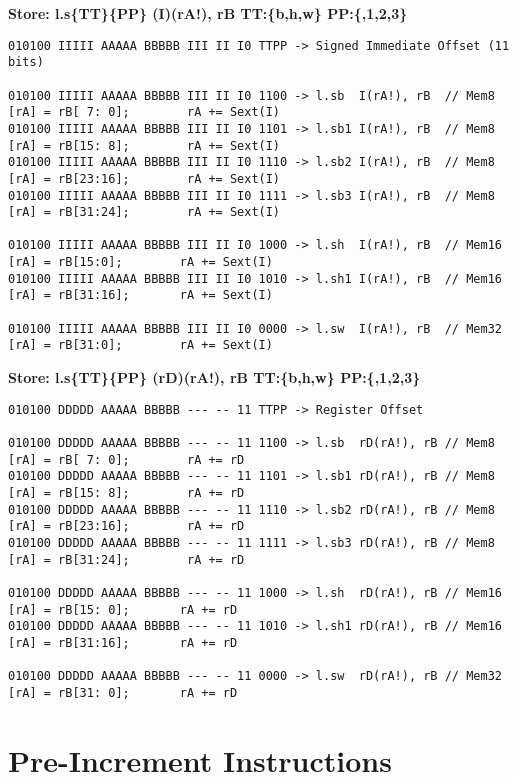 \begin{landscape}
\clearpage

\textbf{Store: l.s\{TT\}\{PP\} (I)(rA!), rB TT:\{b,h,w\} PP:\{,1,2,3\}}

\begin{verbatim}
010100 IIIII AAAAA BBBBB III II I0 TTPP -> Signed Immediate Offset (11 bits)

010100 IIIII AAAAA BBBBB III II I0 1100 -> l.sb  I(rA!), rB  // Mem8 [rA] = rB[ 7: 0];        rA += Sext(I)
010100 IIIII AAAAA BBBBB III II I0 1101 -> l.sb1 I(rA!), rB  // Mem8 [rA] = rB[15: 8];        rA += Sext(I)
010100 IIIII AAAAA BBBBB III II I0 1110 -> l.sb2 I(rA!), rB  // Mem8 [rA] = rB[23:16];        rA += Sext(I)
010100 IIIII AAAAA BBBBB III II I0 1111 -> l.sb3 I(rA!), rB  // Mem8 [rA] = rB[31:24];        rA += Sext(I)

010100 IIIII AAAAA BBBBB III II I0 1000 -> l.sh  I(rA!), rB  // Mem16 [rA] = rB[15:0];        rA += Sext(I)
010100 IIIII AAAAA BBBBB III II I0 1010 -> l.sh1 I(rA!), rB  // Mem16 [rA] = rB[31:16];       rA += Sext(I)

010100 IIIII AAAAA BBBBB III II I0 0000 -> l.sw  I(rA!), rB  // Mem32 [rA] = rB[31:0];        rA += Sext(I)
\end{verbatim}


\textbf{Store: l.s\{TT\}\{PP\} (rD)(rA!), rB TT:\{b,h,w\} PP:\{,1,2,3\}}

\begin{verbatim}
010100 DDDDD AAAAA BBBBB --- -- 11 TTPP -> Register Offset

010100 DDDDD AAAAA BBBBB --- -- 11 1100 -> l.sb  rD(rA!), rB // Mem8 [rA] = rB[ 7: 0];        rA += rD
010100 DDDDD AAAAA BBBBB --- -- 11 1101 -> l.sb1 rD(rA!), rB // Mem8 [rA] = rB[15: 8];        rA += rD
010100 DDDDD AAAAA BBBBB --- -- 11 1110 -> l.sb2 rD(rA!), rB // Mem8 [rA] = rB[23:16];        rA += rD
010100 DDDDD AAAAA BBBBB --- -- 11 1111 -> l.sb3 rD(rA!), rB // Mem8 [rA] = rB[31:24];        rA += rD

010100 DDDDD AAAAA BBBBB --- -- 11 1000 -> l.sh  rD(rA!), rB // Mem16 [rA] = rB[15: 0];       rA += rD
010100 DDDDD AAAAA BBBBB --- -- 11 1010 -> l.sh1 rD(rA!), rB // Mem16 [rA] = rB[31:16];       rA += rD

010100 DDDDD AAAAA BBBBB --- -- 11 0000 -> l.sw  rD(rA!), rB // Mem32 [rA] = rB[31: 0];       rA += rD
\end{verbatim}


\newpage
\section{Pre-Increment Instructions}


\end{landscape}
